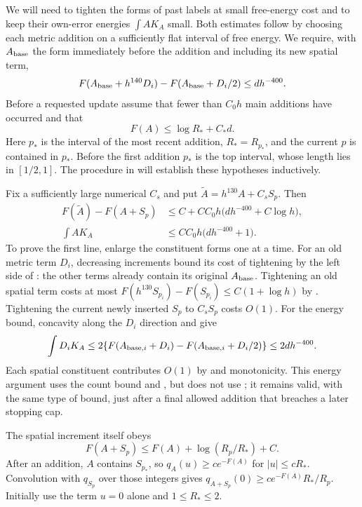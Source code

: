 We will need to tighten the forms of past labels at small free-energy
cost and to keep their own-error energies $\int A K_A$ small. Both estimates
follow by choosing each metric addition on a sufficiently flat interval of
free energy. We require, with $A_{\rm base}$ the form immediately before
the addition and including its new spatial term,
\begin{equation}\label{eq:source-5}
 F(A_{\rm base}+h^{140}D_i)-F(A_{\rm base}+D_i/2)
 \le d h^{-400}.
\end{equation}
Before a requested update assume that fewer than $C_0h$ main additions
have occurred and that
\begin{equation}\label{eq:source-6}
 F(A)\le\log R_*+C_*d.
\end{equation}
Here $p_*$ is the interval of the most recent addition, $R_*=R_{p_*}$,
and the current $p$ is contained in $p_*$.  Before the first addition
$p_*$ is the top interval, whose length lies in $[1/2,1]$.  The procedure
in  will establish these hypotheses inductively.

Fix a sufficiently large numerical $C_s$ and put
$\widetilde A=h^{130}A+C_sS_p$.  Then
\begin{equation}\label{eq:source-7}
 \begin{split}
 F(\widetilde A)-F(A+S_p)
  &\le C+CC_0h\bigl(dh^{-400}+C\log h\bigr),\\
 \int A K_A&\le CC_0h\bigl(dh^{-400}+1\bigr).
 \end{split}
\end{equation}
To prove the first line, enlarge the constituent forms one at a time.
For an old metric term $D_i$, decreasing increments bound its cost of
tightening by the left side of : the other terms already
contain its original $A_{\rm base}$.  Tightening an old spatial term
costs at most
$F(h^{130}S_{p_i})-F(S_{p_i})\le C(1+\log h)$ by
.  Tightening the current newly inserted $S_p$
to $C_sS_p$ costs $O(1)$.  For the energy bound, concavity along the
$D_i$ direction and  give
\[
 \int D_iK_A\le
 2\{F(A_{{\rm base},i}+D_i)-F(A_{{\rm base},i}+D_i/2)\}
 \le2dh^{-400}.
\]
Each spatial constituent contributes $O(1)$ by
 and monotonicity.  This energy argument uses
the count bound and , but does not use
; it remains valid, with the same type of bound, just
after a final allowed addition that breaches a later stopping cap.

The spatial increment itself obeys
\begin{equation}\label{eq:thermal-spatial-increment}
 F(A+S_p)\le F(A)+\log(R_p/R_*)+C.
\end{equation}
After an addition, $A$ contains $S_{p_*}$, so
$q_A(u)\ge ce^{-F(A)}$ for $|u|\le cR_*$.  Convolution with $q_{S_p}$
over those integers gives
$q_{A+S_p}(0)\ge ce^{-F(A)}R_*/R_p$.
Initially use the term $u=0$ alone and $1\le R_*\le2$.

